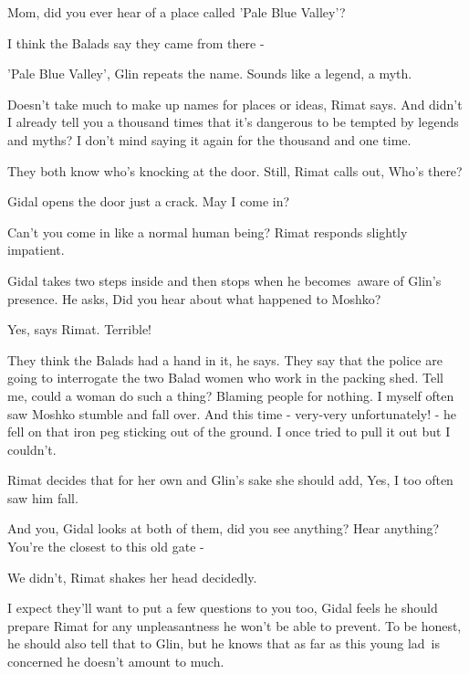 \documentclass[twoside,11pt]{book}
\begin{document}
{\textquotedbl}Mom, did you ever hear of a place called 'Pale Blue Valley'?{\textquotedbl}

{\textquotedbl}I think the Balads say they came from there -{\textquotedbl} 

{\textquotedbl}'Pale Blue Valley',{\textquotedbl} Glin repeats the name. {\textquotedbl}Sounds like a legend, a
myth.{\textquotedbl} 

{\textquotedbl}Doesn't take much to make up names for places or ideas,{\textquotedbl} Rimat says. {\textquotedbl}And
didn't I already tell you a thousand times that it's dangerous to be tempted by legends and myths? I don't mind saying
it again for the thousand and one time.{\textquotedbl} 

They both know who's knocking at the door. Still, Rimat calls out, {\textquotedbl}Who's there?{\textquotedbl}

Gidal opens the door just a crack. {\textquotedbl}May I come in?{\textquotedbl} 

{\textquotedbl}Can't you come in like a normal human being?{\textquotedbl} Rimat responds slightly
impatient{.\ \ }

Gidal takes two steps inside and then stops when he becomes\ aware of Glin's presence. He asks, {\textquotedbl}Did you
hear about what happened to Moshko?{\textquotedbl}

{\textquotedbl}Yes,{\textquotedbl} says Rimat. {\textquotedbl}Terrible!{\textquotedbl} 

{\textquotedbl}They think the Balads had a hand in it,{\textquotedbl} he says. {\textquotedbl}They say that the police
are going to interrogate the two Balad women who work in the packing shed. Tell me, could a woman do such a thing?
Blaming people for nothing. I myself often saw Moshko stumble and fall over. And this time - very{}-very unfortunately!
- he fell on that iron peg sticking out of the ground. I once tried to pull it out but I couldn't.{\textquotedbl} 

Rimat decides that for her own and Glin's sake she should add, {\textquotedbl}Yes, I too often saw him
fall.{\textquotedbl} 

{\textquotedbl}And you,{\textquotedbl} Gidal looks at both of them, {\textquotedbl}did you see anything? Hear anything?
You're the closest to this old gate -{\textquotedbl} 

{\textquotedbl}We didn't,{\textquotedbl} Rimat shakes her head decidedly. 

{\textquotedbl}I expect they'll want to put a few questions to you too,{\textquotedbl} Gidal feels he should prepare
Rimat for any unpleasantness he won't be able to prevent. To be honest, he should also tell that to Glin, but he knows
that as far as this young lad~is concerned he doesn't amount to much. 
\end{document}
